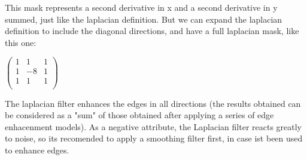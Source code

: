 \documentclass[a4paper]{article}
\begin{document}
This mask represents a second derivative in x and a second derivative in y summed, just like the laplacian definition. But we can expand the laplacian definition to include the diagonal directions, and have a full laplacian mask, like this one: \\
\begin{center}
\begin{math}
   \begin{pmatrix} 
   1 & 1 & 1 \\ 
   1 & -8 & 1 \\
   1 & 1 & 1 \\ 
   \end{pmatrix}
\end{math}\\
\end{center}
The laplacian filter enhances the edges in all directions (the results obtained can be considered as a "sum" of those obtained after applying a series of edge enhacenment models). As a negative attribute, the Laplacian filter reacts greatly to noise, so its recomended to apply a smoothing filter first, in case ist been used to enhance edges.  \\
\end{document}
